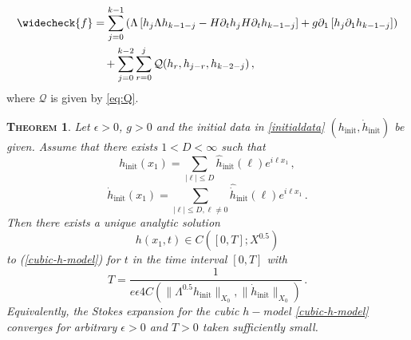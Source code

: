 \documentclass[11pt]{article}
\theoremstyle{plain}
\newtheorem{theorem}{\scshape Theorem}
\theoremstyle{definition}
\theoremstyle{definition}
\def\Q{{\mathcal Q}}
\def\p{\text{\bf\emph{p}}}
\def\bp{{\partial_1}}
\def\p{{\partial\hspace{1pt}}}
\def\comm#1#2{{\llbracket#1,#2\rrbracket}}
\def\smallexp#1{{\text{\small #1}}}
\def\dfrac#1#2{\smallexp{$\displaystyle{}\frac{#1}{#2}$}}
\def\hinit{h_{\operatorname{init}}}
\def\fhinit{\widehat{{ h}}_{\operatorname{init}}}
\def\htinit{{\dot h}_{\operatorname{init}}}
\def\fhtinit{\widehat{{\dot h}}_{\operatorname{init}}}
\begin{document}
\begin{align}
\widecheck{f} &= \sum_{j=0}^{k-1}\left(
\Lambda \left[h_{j}\Lambda h_{k-1-j}  - H\p_{\!t}h_{j}H\p_{\!t}h_{k-1-j}\right]  + g\p_{\!1} \left[ h_{j}\bp h_{k-1-j}\right]
\right)\nonumber\\
&\quad +\sum_{j=0}^{k-2}\sum_{r=0}^{j}\Q(h_r,h_{j-r},h_{k-2-j})\,,\label{eq:forcingwavecubic}
\end{align}
where $\Q$ is given by \eqref{eq:Q}.



\begin{theorem}\label{theorem4}
Let $\epsilon>0$, $g > 0$ and the initial data in \eqref{initialdata} $(\hinit, \htinit)$ be given. Assume that there exists $1<D<\infty$ such that
$$
\hinit(x_1)=\sum_{|\ell|\leq D}\fhinit(\ell)e^{i\ell x_1}\,,
$$
$$
\htinit(x_1)=\sum_{|\ell|\leq D,\ell\neq0}\fhtinit(\ell)e^{i\ell x_1}\,.
$$
Then there exists a unique analytic solution $$h(x_1,t)\in C([0,T];X^{0.5})$$ to {\rm(\ref{cubic-h-model})} for $t$ in the time interval $[0,T]$ with
$$
T=\frac{1}{e \epsilon 4C(\|\Lambda^{0.5}\hinit\|_{X_0},\|\htinit\|_{X_0})} \,.
$$
Equivalently, the Stokes expansion for the cubic $h-$model \eqref{cubic-h-model} converges for arbitrary $\epsilon>0$  and $T>0$ taken sufficiently small.
\end{theorem}
\end{document}
